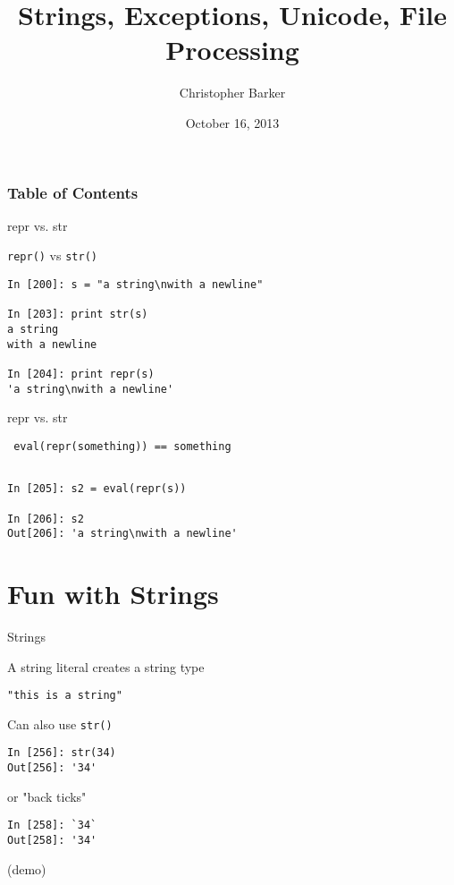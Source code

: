 \documentclass{beamer}
\title[IRIS Python Workshop Session 2a]{Strings, Exceptions, Unicode, File Processing}
\author{Christopher Barker}
\institute{IRIS}
\date{October 16, 2013}
\begin{document}
\begin{frame}
  \titlepage
\end{frame}

\begin{frame}
\frametitle{Table of Contents}
  \tableofcontents
\end{frame}


\begin{frame}[fragile]{repr vs. str}

{\Large \verb|repr()| vs \verb|str()| }

\begin{verbatim}
In [200]: s = "a string\nwith a newline"

In [203]: print str(s)
a string
with a newline

In [204]: print repr(s)
'a string\nwith a newline'

\end{verbatim}

\end{frame}

\begin{frame}[fragile]{repr vs. str}

{\Large \verb| eval(repr(something)) == something | }

\begin{verbatim}

In [205]: s2 = eval(repr(s))

In [206]: s2
Out[206]: 'a string\nwith a newline'
\end{verbatim}

\end{frame}

\section{Fun with Strings}
\begin{frame}[fragile]{Strings}

{\Large A string literal creates a string type}

\begin{verbatim}
"this is a string"
\end{verbatim}

{\Large Can also use \verb|str()|}

\begin{verbatim}
In [256]: str(34)
Out[256]: '34'
\end{verbatim}
{\Large or "back ticks"}
\begin{verbatim}
In [258]: `34`
Out[258]: '34'
\end{verbatim}
(demo)
\end{frame} 
\end{document}

